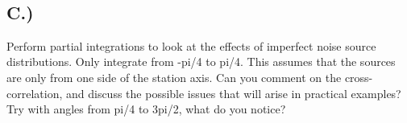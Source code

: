 \documentclass[11pt]{article}
\begin{document}
    \begin{center}
    \end{center}
    { \hspace*{\fill} \\}
    
    \hypertarget{c.}{%
\subsection{C.)}\label{c.}}

Perform partial integrations to look at the effects of imperfect noise
source distributions. Only integrate from -pi/4 to pi/4. This assumes
that the sources are only from one side of the station axis. Can you
comment on the cross-correlation, and discuss the possible issues that
will arise in practical examples? Try with angles from pi/4 to 3pi/2,
what do you notice?
\end{document}
